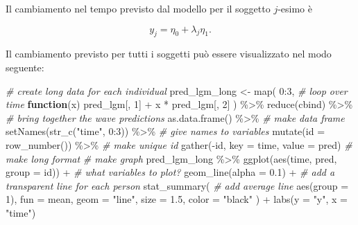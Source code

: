\documentclass[
  11pt,
]{krantz}
\makeatletter
\newenvironment{Shaded}{\begin{snugshade}}{\end{snugshade}}
\newcommand{\AttributeTok}[1]{\textcolor[rgb]{0.61,0.61,0.61}{#1}}
\newcommand{\CommentTok}[1]{\textcolor[rgb]{0.37,0.37,0.37}{\textit{#1}}}
\newcommand{\ControlFlowTok}[1]{\textcolor[rgb]{0.27,0.27,0.27}{\textbf{#1}}}
\newcommand{\DecValTok}[1]{\textcolor[rgb]{0.06,0.06,0.06}{#1}}
\newcommand{\FloatTok}[1]{\textcolor[rgb]{0.06,0.06,0.06}{#1}}
\newcommand{\FunctionTok}[1]{\textcolor[rgb]{0,0,0}{#1}}
\newcommand{\NormalTok}[1]{#1}
\newcommand{\OtherTok}[1]{\textcolor[rgb]{0.37,0.37,0.37}{#1}}
\newcommand{\SpecialCharTok}[1]{\textcolor[rgb]{0,0,0}{#1}}
\newcommand{\StringTok}[1]{\textcolor[rgb]{0.5,0.5,0.5}{#1}}
\newenvironment{kframe}{%
\medskip{}
\setlength{\fboxsep}{.8em}
 \def\at@end@of@kframe{}%
 \ifinner\ifhmode%
  \def\at@end@of@kframe{\end{minipage}}%
  \begin{minipage}{\columnwidth}%
 \fi\fi%
 \def\FrameCommand##1{\hskip\@totalleftmargin \hskip-\fboxsep
 \colorbox{shadecolor}{##1}\hskip-\fboxsep
     \hskip-\linewidth \hskip-\@totalleftmargin \hskip\columnwidth}%
 \MakeFramed {\advance\hsize-\width
   \@totalleftmargin\z@ \linewidth\hsize
   \@setminipage}}%
 {\par\unskip\endMakeFramed%
 \at@end@of@kframe}
\renewenvironment{Shaded}{\begin{kframe}}{\end{kframe}}
\theoremstyle{definition}
\theoremstyle{definition}
\theoremstyle{definition}
\theoremstyle{definition}
\theoremstyle{remark}
\makeatother
\begin{document}
Il cambiamento nel tempo previsto dal modello per il soggetto \(j\)-esimo è

\[
y_j = \eta_0 + \lambda_j \eta_1.
\]

Il cambiamento previsto per tutti i soggetti può essere visualizzato nel modo seguente:

\begin{Shaded}
\begin{Highlighting}[]
\CommentTok{\# create long data for each individual}
\NormalTok{pred\_lgm\_long }\OtherTok{\textless{}{-}} \FunctionTok{map}\NormalTok{(}
  \DecValTok{0}\SpecialCharTok{:}\DecValTok{3}\NormalTok{, }\CommentTok{\# loop over time}
  \ControlFlowTok{function}\NormalTok{(x) pred\_lgm[, }\DecValTok{1}\NormalTok{] }\SpecialCharTok{+}\NormalTok{ x }\SpecialCharTok{*}\NormalTok{ pred\_lgm[, }\DecValTok{2}\NormalTok{]}
\NormalTok{) }\SpecialCharTok{\%\textgreater{}\%}
  \FunctionTok{reduce}\NormalTok{(cbind) }\SpecialCharTok{\%\textgreater{}\%} \CommentTok{\# bring together the wave predictions}
  \FunctionTok{as.data.frame}\NormalTok{() }\SpecialCharTok{\%\textgreater{}\%} \CommentTok{\# make data frame}
  \FunctionTok{setNames}\NormalTok{(}\FunctionTok{str\_c}\NormalTok{(}\StringTok{"time"}\NormalTok{, }\DecValTok{0}\SpecialCharTok{:}\DecValTok{3}\NormalTok{)) }\SpecialCharTok{\%\textgreater{}\%} \CommentTok{\# give names to variables}
  \FunctionTok{mutate}\NormalTok{(}\AttributeTok{id =} \FunctionTok{row\_number}\NormalTok{()) }\SpecialCharTok{\%\textgreater{}\%} \CommentTok{\# make unique id}
  \FunctionTok{gather}\NormalTok{(}\SpecialCharTok{{-}}\NormalTok{id, }\AttributeTok{key =}\NormalTok{ time, }\AttributeTok{value =}\NormalTok{ pred) }\CommentTok{\# make long format}
\CommentTok{\# make graph}
\NormalTok{pred\_lgm\_long }\SpecialCharTok{\%\textgreater{}\%}
  \FunctionTok{ggplot}\NormalTok{(}\FunctionTok{aes}\NormalTok{(time, pred, }\AttributeTok{group =}\NormalTok{ id)) }\SpecialCharTok{+} \CommentTok{\# what variables to plot?}
  \FunctionTok{geom\_line}\NormalTok{(}\AttributeTok{alpha =} \FloatTok{0.1}\NormalTok{) }\SpecialCharTok{+} \CommentTok{\# add a transparent line for each person}
  \FunctionTok{stat\_summary}\NormalTok{( }\CommentTok{\# add average line}
    \FunctionTok{aes}\NormalTok{(}\AttributeTok{group =} \DecValTok{1}\NormalTok{),}
    \AttributeTok{fun =}\NormalTok{ mean,}
    \AttributeTok{geom =} \StringTok{"line"}\NormalTok{,}
    \AttributeTok{size =} \FloatTok{1.5}\NormalTok{,}
    \AttributeTok{color =} \StringTok{"black"}
\NormalTok{  ) }\SpecialCharTok{+}
  \FunctionTok{labs}\NormalTok{(}\AttributeTok{y =} \StringTok{"y"}\NormalTok{, }\AttributeTok{x =} \StringTok{"time"}\NormalTok{)}
\end{Highlighting}
\end{Shaded}
\end{document}
